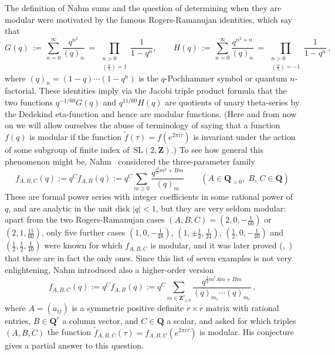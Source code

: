 \documentclass[12pt,reqno]{amsart}
\theoremstyle{definition}
\def\Q{\mathbf Q}   %
\def\Z{\mathbf Z}   %
\def\tf{\widetilde f}
\def\BQ{\mathbf Q}
\def\BQ{\Q}
\def\SL{\mathrm{SL}}
\def\SL{\mathrm{SL}}
\begin{document}
The definition of Nahm sums and the question of determining when they are
modular were motivated by the famous Rogers-Ramanujan identities, which say 
that
$$ 
G(q)\,:=\,\sum_{n=0}^\infty\frac{q^{n^2}}{(q)_n}
 \,=\,\prod_{\substack{ n>0 \\ (\frac n5)=1}}\!\frac1{1-q^n},\qquad
H(q)\,:=\,\sum_{n=0}^\infty\frac{q^{n^2+n}}{(q)_n}
 \,=\,\prod_{\substack{ n>0 \\ (\frac n5)=-1}}\!\frac1{1-q^n}\,,
$$
where $(q)_n=(1-q)\cdots(1-q^n)$ is the $q$-Pochhammer symbol or quantum 
$n$-factorial. These identities imply via the Jacobi triple product formula 
that the two functions $q^{-1/60}G(q)$ and $q^{11/60}H(q)$ are quotients of 
unary theta-series by the Dedekind eta-function and hence are modular 
functions. (Here and from now on we will allow ourselves the abuse of 
terminology of saying that a function $f(q)$ is modular if 
the function 
$\tf(\tau)=f(e^{2\pi i\tau})$ is invariant under the action of some subgroup of
finite index of~$\SL(2,\Z)$.)  To see how general this phenomenon might be,
Nahm~\cite{Nahm} considered the three-parameter family 
\begin{equation}
\label{eq.FABC1}
f_{A,B,C}(q) :=q^C f_{A,B}(q) := q^C
\sum_{m\ge0} \frac{q^{\frac A2m^2+Bm}}{(q)_m} \qquad(A\in\Q_{>0},\;B,\,C\in\Q)
\end{equation}
These are formal power series with integer coefficients in some rational 
power of~$q$, and are analytic in the unit disk $|q|<1$, but they are very 
seldom modular: apart from the two Rogers-Ramanujan cases 
$(A,B,C)=(2,0,-\frac1{60})$ or $(2,1,\frac{11}{60})$, only five 
further cases $(1,0,-\frac1{48})$, $(1,\pm\frac12,\frac1{24})$, 
$(\frac12,0,-\frac1{40})$ and $(\frac12,\frac12,\frac1{40})$ were known for 
which $f_{A,B,C}$ is modular, and it was later proved 
(\cite{Terhoeven},~\cite{Zagier}) that these are in fact the only ones. Since
this list of seven examples is not very enlightening, Nahm introduced also 
a higher-order version  
\begin{equation}
\label{eq.FABC}
f_{A,B,C}(q)  :=q^C f_{A,B}(q):= q^C
\sum_{m\in\Z_{\ge0}^r} \frac{q^{\frac12 m^tAm + Bm}}{(q)_{m_1}\cdots(q)_{m_r}}\,,
\end{equation}
where
$A=(a_{ij})$ is a symmetric positive definite $r \times r$ matrix with 
rational entries, $B \in \Q^r$ a column vector, and $C \in \BQ$ a scalar, 
and asked for which triples $(A,B,C)$ the function 
$\tf_{A,B,C}(\tau)=f_{A,B,C}(e^{2\pi i\tau})$ is modular. His conjecture gives 
a partial answer to this question.
\end{document}
